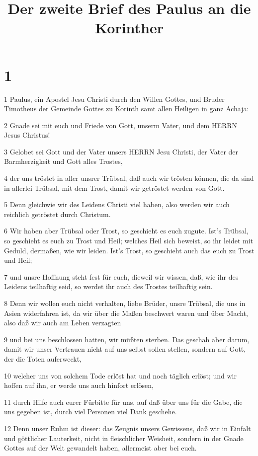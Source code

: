 

\title{Der zweite Brief des Paulus an die Korinther}


\chapter{1}

\par 1 Paulus, ein Apostel Jesu Christi durch den Willen Gottes, und Bruder Timotheus der Gemeinde Gottes zu Korinth samt allen Heiligen in ganz Achaja:
\par 2 Gnade sei mit euch und Friede von Gott, unserm Vater, und dem HERRN Jesus Christus!
\par 3 Gelobet sei Gott und der Vater unsers HERRN Jesu Christi, der Vater der Barmherzigkeit und Gott alles Trostes,
\par 4 der uns tröstet in aller unsrer Trübsal, daß auch wir trösten können, die da sind in allerlei Trübsal, mit dem Trost, damit wir getröstet werden von Gott.
\par 5 Denn gleichwie wir des Leidens Christi viel haben, also werden wir auch reichlich getröstet durch Christum.
\par 6 Wir haben aber Trübsal oder Trost, so geschieht es euch zugute. Ist's Trübsal, so geschieht es euch zu Trost und Heil; welches Heil sich beweist, so ihr leidet mit Geduld, dermaßen, wie wir leiden. Ist's Trost, so geschieht auch das euch zu Trost und Heil;
\par 7 und unsre Hoffnung steht fest für euch, dieweil wir wissen, daß, wie ihr des Leidens teilhaftig seid, so werdet ihr auch des Trostes teilhaftig sein.
\par 8 Denn wir wollen euch nicht verhalten, liebe Brüder, unsre Trübsal, die uns in Asien widerfahren ist, da wir über die Maßen beschwert waren und über Macht, also daß wir auch am Leben verzagten
\par 9 und bei uns beschlossen hatten, wir müßten sterben. Das geschah aber darum, damit wir unser Vertrauen nicht auf uns selbst sollen stellen, sondern auf Gott, der die Toten auferweckt,
\par 10 welcher uns von solchem Tode erlöst hat und noch täglich erlöst; und wir hoffen auf ihn, er werde uns auch hinfort erlösen,
\par 11 durch Hilfe auch eurer Fürbitte für uns, auf daß über uns für die Gabe, die uns gegeben ist, durch viel Personen viel Dank geschehe.
\par 12 Denn unser Ruhm ist dieser: das Zeugnis unsers Gewissens, daß wir in Einfalt und göttlicher Lauterkeit, nicht in fleischlicher Weisheit, sondern in der Gnade Gottes auf der Welt gewandelt haben, allermeist aber bei euch.
